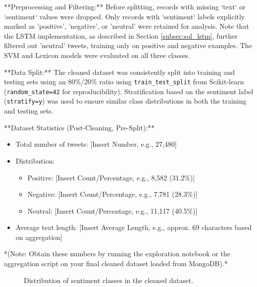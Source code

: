 \documentclass[10pt,twocolumn]{article}
\begin{document}
**Preprocessing and Filtering:** Before splitting, records with missing `text` or `sentiment` values were dropped. Only records with `sentiment` labels explicitly marked as 'positive', 'negative', or 'neutral' were retained for analysis. Note that the LSTM implementation, as described in Section \ref{subsec:sol_lstm}, further filtered out 'neutral' tweets, training only on positive and negative examples. The SVM and Lexicon models were evaluated on all three classes.

**Data Split:** The cleaned dataset was consistently split into training and testing sets using an 80\%/20\% ratio using \texttt{train\_test\_split} from Scikit-learn (\texttt{random\_state=42} for reproducibility). Stratification based on the sentiment label (\texttt{stratify=y}) was used to ensure similar class distributions in both the training and testing sets. %

**Dataset Statistics (Post-Cleaning, Pre-Split):**
\begin{itemize}[itemsep=0pt, topsep=3pt]
    \item Total number of tweets: [Insert Number, e.g., 27,480]
    \item Distribution:
        \begin{itemize}
            \item Positive: [Insert Count/Percentage, e.g., 8,582 (31.2\%)]
            \item Negative: [Insert Count/Percentage, e.g., 7,781 (28.3\%)]
            \item Neutral: [Insert Count/Percentage, e.g., 11,117 (40.5\%)]
        \end{itemize}
    \item Average text length: [Insert Average Length, e.g., approx. 69 characters based on aggregation]
\end{itemize}
*(Note: Obtain these numbers by running the exploration notebook or the aggregation script on your final cleaned dataset loaded from MongoDB).*

\begin{figure}[H] %
    \centering
    \caption{Distribution of sentiment classes in the cleaned dataset.}
    \label{fig:sentiment_dist}
\end{figure}
\end{document}
